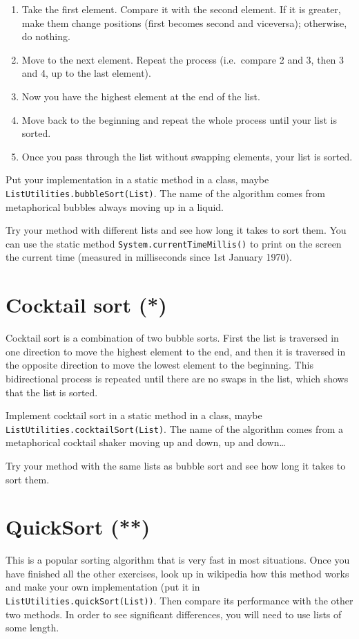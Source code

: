 \documentclass{article}
\begin{document}
\begin{enumerate}
\item Take the first element. Compare it with the second element. If
  it is greater, make them change positions (first becomes second and
  viceversa); otherwise, do nothing.
\item Move to the next element. Repeat the process (i.e.~compare 2 and
  3, then 3 and 4, up to the last element).
\item Now you have the highest element at the end of the list.
\item Move back to the beginning and repeat the whole process until
  your list is sorted.
\item Once you pass through the list without swapping elements, your
  list is sorted. 
\end{enumerate}

Put your implementation in a static method in a class, maybe
\verb+ListUtilities.bubbleSort(List)+. The name of the algorithm comes
from metaphorical bubbles always moving up in a liquid. 

Try your method with different lists and see how long it takes to sort
them. You can use the static method \verb+System.currentTimeMillis()+
to print on the screen the current time (measured in milliseconds
since 1st January 1970). 

\section{Cocktail sort (*)}
\label{sec:cocktail-sort}

Cocktail sort is a combination of two bubble sorts. First the list is
traversed in one direction to move the highest element to the end, and
then it is traversed in the opposite direction to move the lowest
element to the beginning. This bidirectional process is repeated until
there are no swaps in the list, which shows that the list is sorted. 

Implement cocktail sort in a static method in a class, maybe
\verb+ListUtilities.cocktailSort(List)+. The name of the algorithm comes
from a metaphorical cocktail shaker moving up and down, up and
down\ldots 

Try your method with the same lists as bubble sort 
and see how long it takes to sort them. 

\section{QuickSort (**)}
\label{sec:quicksort-}

This is a popular sorting algorithm that is very fast in most
situations. Once you have finished all the other exercises, look up in
wikipedia how this method works and make your own implementation (put
it in \verb+ListUtilities.quickSort(List))+. Then compare its
performance with the other two methods. In order to see significant
differences, you will need to use lists of some length. 
\end{document}

